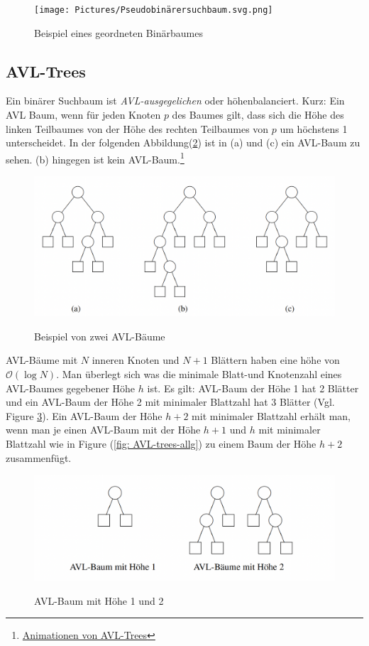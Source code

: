 \documentclass[a4paper]{article}
\begin{document}
\begin{figure}[h] 
\caption{Beispiel eines geordneten Binärbaumes}
\centering
\texttt{[image: Pictures/Pseudobinärersuchbaum.svg.png]}
\label{fig: binarytree}
\end{figure}




\subsection{AVL-Trees}
Ein binärer Suchbaum ist \textit{AVL-ausgegelichen} oder höhenbalanciert. Kurz: Ein AVL Baum, wenn für jeden Knoten $p$ des Baumes gilt, dass sich die Höhe des linken Teilbaumes von der Höhe des rechten Teilbaumes von $p$ um höchstens 1 unterscheidet. In der folgenden Abbildung(\ref{fig: AVL-trees}) ist in (a)  und (c) ein AVL-Baum zu sehen. (b) hingegen ist kein AVL-Baum.\footnote{\href{https://www.cs.usfca.edu/~galles/visualization/AVLtree.html}{Animationen von AVL-Trees}}

\begin{figure}[h] 
\caption{Beispiel von zwei AVL-Bäume}
\centering
\includegraphics[scale= 0.5]{Pictures/AVL-trees.png}
\label{fig: AVL-trees}
\end{figure}

AVL-Bäume mit $N$ inneren Knoten und $N+1$ Blättern haben eine höhe von $\mathcal{O}(\log N)$. Man überlegt sich was die minimale Blatt-und Knotenzahl eines AVL-Baumes gegebener Höhe $h$ ist. Es gilt: AVL-Baum der Höhe 1 hat 2 Blätter und ein AVL-Baum der Höhe 2 mit minimaler Blattzahl hat 3 Blätter (Vgl. Figure \ref{fig: AVL-trees-height}). Ein AVL-Baum der Höhe $h+2$ mit minimaler Blattzahl erhält man, wenn man je einen AVL-Baum mit der Höhe $h+1$ und $h$ mit minimaler Blattzahl wie in Figure (\ref{fig: AVL-trees-allg}) zu einem Baum der Höhe $h+2$ zusammenfügt.

\begin{figure}[h] 
\caption{AVL-Baum mit Höhe 1 und 2}
\centering
\includegraphics[scale= 0.5]{Pictures/AVL-trees-height.png}
\label{fig: AVL-trees-height}
\end{figure}
\end{document}
